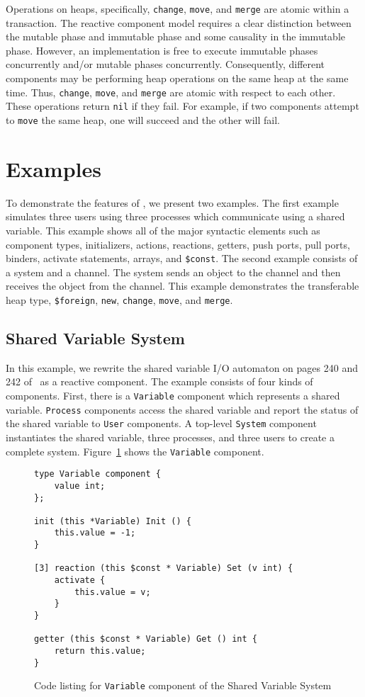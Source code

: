 Operations on heaps, specifically, \verb+change+, \verb+move+, and \verb+merge+ are atomic within a transaction.
The reactive component model requires a clear distinction between the mutable phase and immutable phase and some causality in the immutable phase.
However, an implementation is free to execute immutable phases concurrently and/or mutable phases concurrently.
Consequently, different components may be performing heap operations on the same heap at the same time.
Thus, \verb+change+, \verb+move+, and \verb+merge+ are atomic with respect to each other.
These operations return \verb+nil+ if they fail.
For example, if two components attempt to \verb+move+ the same heap, one will succeed and the other will fail.

\section{Examples}

To demonstrate the features of \rcgo{}, we present two examples.
The first example simulates three users using three processes which communicate using a shared variable.
This example shows all of the major syntactic elements such as component types, initializers, actions, reactions, getters, push ports, pull ports, binders, activate statements, arrays, and \verb+$const+.
The second example consists of a system and a channel.
The system sends an object to the channel and then receives the object from the channel.
This example demonstrates the transferable heap type, \verb+$foreign+, \verb+new+, \verb+change+, \verb+move+, and \verb+merge+.

\subsection{Shared Variable System}

In this example, we rewrite the shared variable I/O automaton on pages 240 and 242 of~\cite{nancy1996distributed} as a reactive component.
The example consists of four kinds of components.
First, there is a \verb+Variable+ component which represents a shared variable.
\verb+Process+ components access the shared variable and report the status of the shared variable to \verb+User+ components.
A top-level \verb+System+ component instantiates the shared variable, three processes, and three users to create a complete system.
Figure~\ref{variable} shows the \verb+Variable+ component.

\begin{figure}[h]
\begin{verbatim}
type Variable component {
    value int;
};

init (this *Variable) Init () {
    this.value = -1;
}

[3] reaction (this $const * Variable) Set (v int) {
    activate {
        this.value = v;
    }
}

getter (this $const * Variable) Get () int {
    return this.value;
}
\end{verbatim}
\cprotect\caption{Code listing for \verb+Variable+ component of the Shared Variable System}
\label{variable}
\end{figure}

